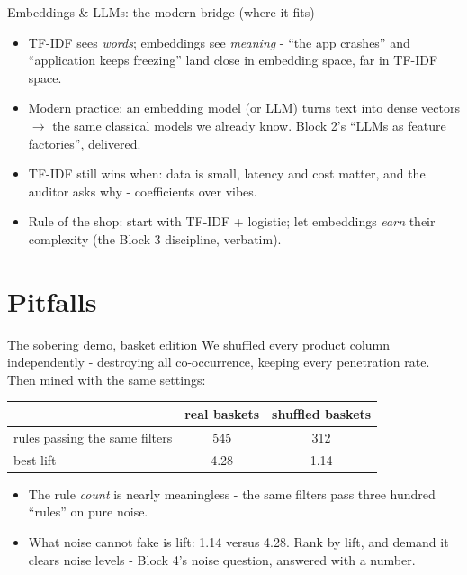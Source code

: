 \documentclass[10pt,aspectratio=169]{beamer}
\begin{document}
\begin{frame}{Embeddings \& LLMs: the modern bridge (where it fits)}
  \begin{itemize}
    \item TF-IDF sees \emph{words}; embeddings see \emph{meaning} -
          ``the app crashes'' and ``application keeps freezing'' land close
          in embedding space, far in TF-IDF space.
    \item Modern practice: an embedding model (or LLM) turns text into
          dense vectors $\to$ the same classical models we already know.
          \alert{Block 2's ``LLMs as feature factories''}, delivered.
    \item TF-IDF still wins when: data is small, latency and cost matter,
          and the \alert{auditor asks why} - coefficients over vibes.
    \item Rule of the shop: start with TF-IDF + logistic; let embeddings
          \emph{earn} their complexity (the Block 3 discipline, verbatim).
  \end{itemize}
\end{frame}

\section{Pitfalls}

\begin{frame}{The sobering demo, basket edition}
  We shuffled every product column independently - destroying all
  co-occurrence, keeping every penetration rate. Then mined with the same
  settings:
  \vspace{0.4em}
  \begin{center}
  \begin{tabular}{@{}lcc@{}}
    \toprule
     & real baskets & \alert{shuffled baskets} \\
    \midrule
    rules passing the same filters & 545 & \alert{312} \\
    best lift & 4.28 & \alert{1.14} \\
    \bottomrule
  \end{tabular}
  \end{center}
  \vspace{0.5em}
  \begin{itemize}\small
    \item The rule \emph{count} is nearly meaningless - the same filters
          pass \alert{three hundred ``rules''} on pure noise.
    \item What noise cannot fake is \alert{lift}: 1.14 versus 4.28. Rank by
          lift, and demand it clears noise levels - Block 4's noise
          question, answered with a number.
  \end{itemize}
\end{frame}
\end{document}
